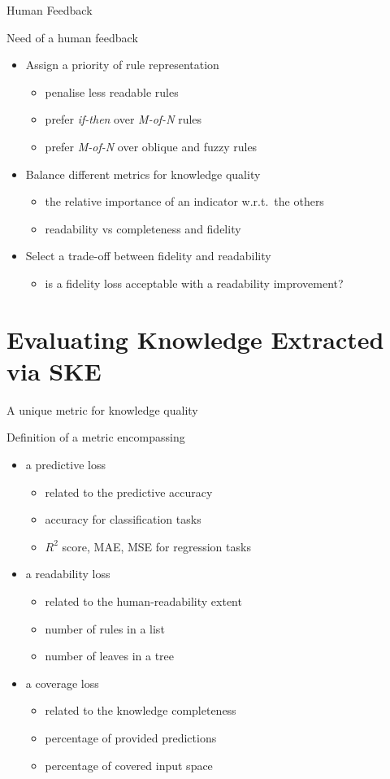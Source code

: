 \documentclass{beamer}
\newcommand{\eg}{\item[e.g.]}
\newcommand{\lookat}{\item[\ding{43}]}
\begin{document}
\begin{frame}[c]{Human Feedback}
	\begin{block}{Need of a human feedback}
		\medskip
		\begin{itemize}
			\lookat Assign a priority of rule representation
			\begin{itemize}
				\item penalise less readable rules
				\eg prefer \emph{if-then} over \emph{M-of-N} rules
				\eg prefer \emph{M-of-N} over oblique and fuzzy rules
			\end{itemize}
			\medskip
			\lookat Balance different metrics for knowledge quality
			\begin{itemize}
				\item the relative importance of an indicator w.r.t.\ the others
				\eg readability vs completeness and fidelity
			\end{itemize}
			\medskip
			\lookat Select a trade-off between fidelity and readability
			\begin{itemize}
				\item is a fidelity loss acceptable with a readability improvement?
			\end{itemize}
		\end{itemize}
		\medskip
	\end{block}
\end{frame}

\section{Evaluating Knowledge Extracted via SKE}

\begin{frame}[c]{A unique metric for knowledge quality}
	\begin{block}{Definition of a metric encompassing}
		\smallskip
		\begin{itemize}
			\lookat a predictive loss
			\begin{itemize}
				\item related to the predictive accuracy
				\eg accuracy for classification tasks
				\eg $R^2$ score, MAE, MSE for regression tasks
			\end{itemize}
			\smallskip
			\lookat a readability loss
			\begin{itemize}
				\item related to the human-readability extent
				\eg number of rules in a list
				\eg number of leaves in a tree
			\end{itemize}
			\smallskip
			\lookat a coverage loss
			\begin{itemize}
				\item related to the knowledge completeness
				\eg percentage of provided predictions
				\eg percentage of covered input space
			\end{itemize}
		\end{itemize}
		\smallskip
	\end{block}
\end{frame}
\end{document}
